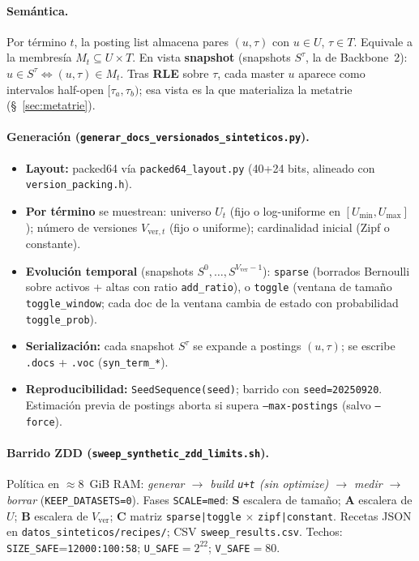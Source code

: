 \paragraph{Semántica.}
Por término $t$, la posting list almacena pares $(u,\tau)$ con $u\in U$, $\tau\in T$.
Equivale a la membresía $M_t\subseteq U\times T$. En vista \textbf{snapshot}
(snapshots $S^\tau$, la de Backbone~2): $u\in S^\tau \Leftrightarrow (u,\tau)\in M_t$.
Tras \textbf{RLE} sobre $\tau$, cada master $u$ aparece como intervalos half-open
$[\tau_a,\tau_b)$; esa vista es la que materializa la metatrie (§~\ref{sec:metatrie}).

\paragraph{Generación (\texttt{generar\_docs\_versionados\_sinteticos.py}).}
\begin{itemize}
\item \textbf{Layout:} packed64 vía \texttt{packed64\_layout.py} (40+24 bits, alineado con
      \texttt{version\_packing.h}).
\item \textbf{Por término} se muestrean: universo $U_t$ (fijo o log-uniforme en
      $[U_{\min},U_{\max}]$); número de versiones $V_{\mathrm{ver},t}$ (fijo o uniforme);
      cardinalidad inicial (Zipf o constante).
\item \textbf{Evolución temporal} (snapshots $S^0,\ldots,S^{V_{\mathrm{ver}}-1}$):
      \texttt{sparse} (borrados Bernoulli sobre activos + altas con ratio \texttt{add\_ratio}), o
      \texttt{toggle} (ventana de tamaño \texttt{toggle\_window}; cada doc de la ventana
      cambia de estado con probabilidad \texttt{toggle\_prob}).
\item \textbf{Serialización:} cada snapshot $S^\tau$ se expande a postings $(u,\tau)$;
      se escribe \texttt{.docs} + \texttt{.voc} (\texttt{syn\_term\_*}).
\item \textbf{Reproducibilidad:} \texttt{SeedSequence(seed)}; barrido con \texttt{seed=20250920}.
      Estimación previa de postings aborta si supera \texttt{--max-postings} (salvo \texttt{--force}).
\end{itemize}

\paragraph{Barrido ZDD (\texttt{sweep\_synthetic\_zdd\_limits.sh}).}
Política en $\approx 8$~GiB RAM:
\emph{generar $\to$ build \texttt{u+t} (sin optimize) $\to$ medir $\to$ borrar}
(\texttt{KEEP\_DATASETS=0}).
Fases \texttt{SCALE=med}:
\textbf{S} escalera de tamaño; \textbf{A} escalera de $U$; \textbf{B} escalera de $V_{\mathrm{ver}}$;
\textbf{C} matriz \texttt{sparse|toggle} $\times$ \texttt{zipf|constant}.
Recetas JSON en \texttt{datos\_sinteticos/recipes/}; CSV \texttt{sweep\_results.csv}.
Techos: \texttt{SIZE\_SAFE}=\texttt{12000:100:58}; \texttt{U\_SAFE}$=2^{22}$; \texttt{V\_SAFE}$=80$.

